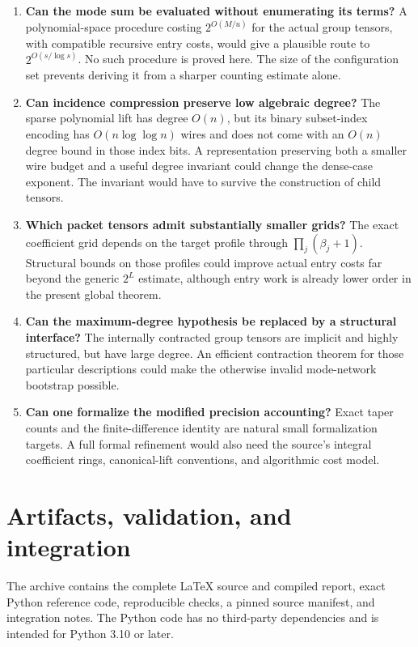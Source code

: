 \documentclass[11pt]{article}
\theoremstyle{remark}
\begin{document}
\begin{enumerate}
\item \textbf{Can the mode sum be evaluated without enumerating its terms?} A polynomial-space procedure costing $2^{O(M/u)}$ for the actual group tensors, with compatible recursive entry costs, would give a plausible route to $2^{O(s/\log s)}$. No such procedure is proved here. The size of the configuration set prevents deriving it from a sharper counting estimate alone.
\item \textbf{Can incidence compression preserve low algebraic degree?} The sparse polynomial lift has degree $O(n)$, but its binary subset-index encoding has $O(n\log\log n)$ wires and does not come with an $O(n)$ degree bound in those index bits. A representation preserving both a smaller wire budget and a useful degree invariant could change the dense-case exponent. The invariant would have to survive the construction of child tensors.
\item \textbf{Which packet tensors admit substantially smaller grids?} The exact coefficient grid depends on the target profile through $\prod_j(\beta_j+1)$. Structural bounds on those profiles could improve actual entry costs far beyond the generic $2^L$ estimate, although entry work is already lower order in the present global theorem.
\item \textbf{Can the maximum-degree hypothesis be replaced by a structural interface?} The internally contracted group tensors are implicit and highly structured, but have large degree. An efficient contraction theorem for those particular descriptions could make the otherwise invalid mode-network bootstrap possible.
\item \textbf{Can one formalize the modified precision accounting?} Exact taper counts and the finite-difference identity are natural small formalization targets. A full formal refinement would also need the source's integral coefficient rings, canonical-lift conventions, and algorithmic cost model.
\end{enumerate}

\section{Artifacts, validation, and integration}
\label{sec:artifacts}

The archive contains the complete \LaTeX{} source and compiled report, exact Python reference code, reproducible checks, a pinned source manifest, and integration notes. The Python code has no third-party dependencies and is intended for Python 3.10 or later.
\end{document}
